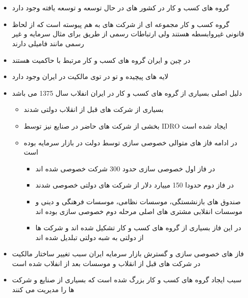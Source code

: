 \documentclass[12pt, a4paper]{article}
\begin{document}
\begin{appendices}
\begin{itemize}
\begin{itemize}
		
		
	\end{itemize}
\end{itemize}
















\FloatBarrier



\section{} \label{BGDef}

\begin{itemize}
	\item 
	گروه های کسب و کار در کشور های در حال توسعه و توسعه یافته وجود دارد
	
	\item 
	گروه کسب و کار مجموعه ای از شرکت های به هم پیوسته است که از لحاظ قانونی غیروابسطه هستند ولی ارتباطات رسمی از طریق برای مثال سرمایه و غیر رسمی مانند فامیلی دارند
	\item 
	در چین و ایران گروه های کسب و کار مرتبط با حاکمیت هستند
	
	\item 
	لایه های پیچیده و تو در توی مالکیت در ایران وجود دارد 
	
	\item 
	دلیل اصلی بسیاری از گروه های کسب و کار در ایران انفلاب سال 
1375 می باشد

\begin{itemize}
	\item 
	بسیاری از شرکت های قبل از انقلاب دولتی شدند
	\item 
	بخشی از شرکت های حاضر در صنایع نیز توسط IDRO ایجاد شده است
	\item 
	در ادامه فاز های متوالی خصوصی سازی توسط دولت در بازار سرمایه  بوده است
\begin{itemize}
	\item 
	در فاز اول خصوصی سازی حدود 300 شرکت خصوصی شده اند
	\item 
	در فاز دوم حدودا 150 مییارد دلار از شرکت های دولتی خصوصی شدند 
	\item 
	صندوق های بازنشستگی، موسسات نظامی، موسسات فرهنگی و دینی و موسسات انقلابی مشتری های اصلی مرحله دوم خصوصی سازی بوده اند
	\item 
	در این فاز بسیاری از  گروه های کسب و کار تشکیل شده اند و شرکت ها از دولتی به شبه دولتی تبلدیل شده اند	
\end{itemize}
\end{itemize}	
\item
فاز های خصوصی سازی و گسترش بازار سرمایه ایران سبب تغییر ساختار مالکیت در شرکت های قبل از انقلاب و موسسات بعد از انفلاب شده است
\item
سبب ایجاد گروه های کسب و کار بزرگ شده است که بسیاری از صنایع و شرکت ها را مدیریت می کنند


\end{itemize}
\end{appendices}
\end{document}
